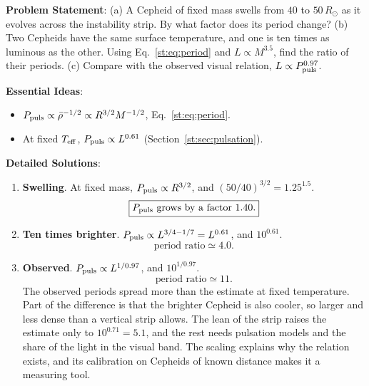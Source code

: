 \textbf{Problem Statement}: (a) A Cepheid of fixed mass swells from $40$ to $50\,R_\odot$ as it evolves across the instability strip. By what factor does its period change? (b) Two Cepheids have the same surface temperature, and one is ten times as luminous as the other. Using Eq.~\eqref{st:eq:period} and $L\propto M^{3.5}$, find the ratio of their periods. (c) Compare with the observed visual relation, $L\propto P_{\rm puls}^{0.97}$.

\textbf{Essential Ideas}:
\begin{itemize}
	\item $P_{\rm puls}\propto\bar\rho^{-1/2}\propto R^{3/2}M^{-1/2}$, Eq.~\eqref{st:eq:period}.
	\item At fixed $T_{\rm eff}$, $P_{\rm puls}\propto L^{0.61}$ (Section~\ref{st:sec:pulsation}).
\end{itemize}

\textbf{Detailed Solutions}:
\begin{enumerate}[label=(\alph*)]
	\item \textbf{Swelling}. At fixed mass, $P_{\rm puls}\propto R^{3/2}$, and $(50/40)^{3/2}=1.25^{1.5}$.
	\[
	\boxed{P_{\rm puls}\ \text{grows by a factor}\ 1.40.}
	\]
	\item \textbf{Ten times brighter}. $P_{\rm puls}\propto L^{3/4-1/7}=L^{0.61}$, and $10^{0.61}$.
	\[
	\boxed{\text{period ratio}\simeq4.0.}
	\]
	\item \textbf{Observed}. $P_{\rm puls}\propto L^{1/0.97}$, and $10^{1/0.97}$.
	\[
	\boxed{\text{period ratio}\simeq11.}
	\]
	The observed periods spread more than the estimate at fixed temperature. Part of the difference is that the brighter Cepheid is also cooler, so larger and less dense than a vertical strip allows. The lean of the strip raises the estimate only to $10^{0.71}=5.1$, and the rest needs pulsation models and the share of the light in the visual band. The scaling explains why the relation exists, and its calibration on Cepheids of known distance makes it a measuring tool.
\end{enumerate}
